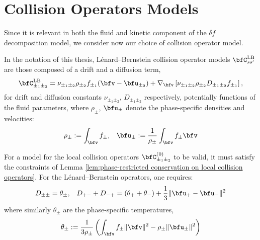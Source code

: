 \section{Collision Operators Models}\label{cha:collision operators}
    Since it is relevant in both the fluid and kinetic component of the $\delta\!f$ decomposition model, we consider now our choice of collision operator model.

    \line

    \begin{definition}\label{def:Lénard--Bernstein collision operators}
        In the notation of this thesis, Lénard--Bernstein collision operator models $\bfC_{ss'}^{\rm LB}$ are those composed of a drift and a diffusion term,
        \begin{equation}\label{eqn:Lénard--Bernstein operator}
            \bfC_{\pm_{1}\pm_{2}}^{\rm LB}  =  \nu_{\pm_{1}\pm_{2}}\rho_{\pm_{2}}f_{\pm_{1}}(\bfv - \bfu_{\pm_{2}}) + \nabla_{\bfv}\left[\nu_{\pm_{1}\pm_{2}}\rho_{\pm_{2}}D_{\pm_{1}\pm_{2}}f_{\pm_{1}}\right],
        \end{equation}
        for drift and diffusion constants $\nu_{\pm_{1}\pm_{2}}$, $D_{\pm_{1}\pm_{2}}$ respectively, potentially functions of the fluid parameters, where $\rho_{\pm}$, $\bfu_{\pm}$ denote the phase-specific densities and velocities:
        \begin{align}
            \rho_{\pm}  :=                      \int_{\bfv}f_{\pm},  &&
            \bfu_{\pm}  :=  \frac{1}{\rho_{\pm}}\int_{\bfv}f_{\pm}\bfv
        \end{align}
    \end{definition}

    \line

    For a model for the local collision operators $\bfC_{\pm_{1}\pm_{2}}^{(0)}$ to be valid, it must satisfy the constraints of Lemma \ref{lem:phase-restricted conservation on local collision operators}. For the Lénard--Bernstein operators, one requires:
    \begin{align}
             D_{\pm\pm}  =  \theta_{\pm},  &&
        D_{+-} + D_{-+}  =  (\theta_{+} + \theta_{-}) + \frac{1}{3}\|\bfu_{+} - \bfu_{-}\|^{2}
    \end{align}
    where similarly $\theta_{\pm}$ are the phase-specific temperatures,
    \begin{equation}
        \theta_{\pm}  :=  \frac{1}{3\rho_{\pm}}\left(\int_{\bfv}f_{\pm}\|\bfv\|^{2} - \rho_{\pm}\|\bfu_{\pm}\|^{2}\right)
    \end{equation}

